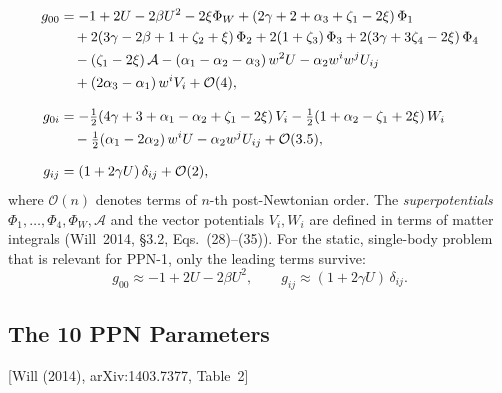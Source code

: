 \documentclass[11pt,a4paper]{article}
\theoremstyle{plain}
\theoremstyle{definition}
\theoremstyle{remark}
\newcommand{\fromlit}[1]{\textcolor{sctblue}{\textsf{[#1]}}}
\begin{document}
\begin{align}
  g_{00} &= -1 + 2U - 2\beta U^2
    - 2\xi\Phi_W
    + (2\gamma + 2 + \alpha_3 + \zeta_1 - 2\xi)\,\Phi_1
    \notag\\
    &\quad + 2(3\gamma - 2\beta + 1 + \zeta_2 + \xi)\,\Phi_2
    + 2(1 + \zeta_3)\,\Phi_3
    + 2(3\gamma + 3\zeta_4 - 2\xi)\,\Phi_4
    \notag\\
    &\quad - (\zeta_1 - 2\xi)\,\mathcal{A}
    - (\alpha_1 - \alpha_2 - \alpha_3)\,w^2 U
    - \alpha_2 w^i w^j U_{ij}
    \notag\\
    &\quad + (2\alpha_3 - \alpha_1)\,w^i V_i
    + \mathcal{O}(4),
    \label{eq:ppn-g00}\\[8pt]
  g_{0i} &= -\tfrac{1}{2}(4\gamma + 3 + \alpha_1
    - \alpha_2 + \zeta_1 - 2\xi)\,V_i
    - \tfrac{1}{2}(1 + \alpha_2 - \zeta_1 + 2\xi)\,W_i
    \notag\\
    &\quad - \tfrac{1}{2}(\alpha_1 - 2\alpha_2)\,w^i U
    - \alpha_2 w^j U_{ij}
    + \mathcal{O}(3.5),
    \label{eq:ppn-g0i}\\[8pt]
  g_{ij} &= (1 + 2\gamma U)\,\delta_{ij}
    + \mathcal{O}(2),
    \label{eq:ppn-gij}
\end{align}
where $\mathcal{O}(n)$ denotes terms of $n$-th post-Newtonian order.
The \emph{superpotentials} $\Phi_1, \ldots, \Phi_4, \Phi_W,
\mathcal{A}$ and the vector potentials $V_i, W_i$ are defined in
terms of matter integrals (Will~2014, \S3.2, Eqs.~(28)--(35)).
For the static, single-body problem that is relevant for PPN-1,
only the leading terms survive:
\begin{equation}\label{eq:ppn-static}
  g_{00} \approx -1 + 2U - 2\beta U^2,\qquad
  g_{ij} \approx (1 + 2\gamma U)\,\delta_{ij}.
\end{equation}

\subsection{The 10 PPN Parameters}

\fromlit{Will (2014), arXiv:1403.7377, Table~2}
\end{document}
